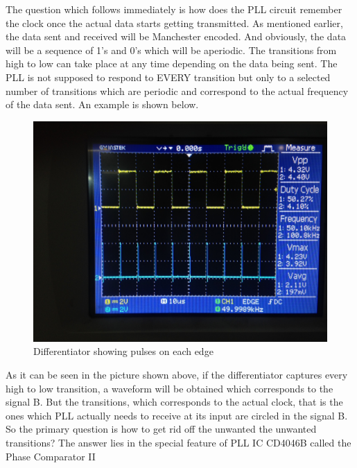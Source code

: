 \documentclass{article}
\begin{document}
\begin{enumerate}[label=(\Alph*)]
The question which follows immediately is how does the PLL circuit remember the clock once the actual data starts getting transmitted. As mentioned earlier, the data sent and received will be Manchester encoded. And obviously, the data will be a sequence of 1’s and 0’s which will be aperiodic. The transitions from high to low can take place at any time depending on the data being sent. The PLL is not supposed to respond to EVERY transition but only to a selected number of transitions which are periodic and correspond to the actual frequency of the data sent. An example is shown below.


\begin{figure}[h]

	\centering
	\includegraphics[scale = 0.1]{images/Diff_all_pulses.JPG}
	\caption{Differentiator showing pulses on each edge}
	\label{Fig :1b}


\end{figure}

As it can be seen in the picture shown above, if the differentiator captures every high to low transition, a waveform will be obtained which corresponds to the signal B. But the transitions, which corresponds to the actual clock, that is the ones which PLL actually needs to receive at its input are circled in the signal B. So the primary question is how to get rid off the unwanted the unwanted transitions?  
The answer lies in the special feature of PLL IC CD4046B called the Phase Comparator II


\end{enumerate}
\end{document}
